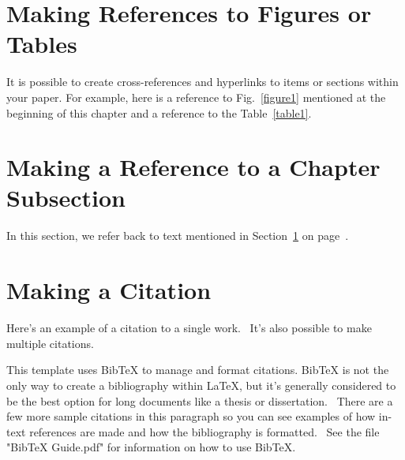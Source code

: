 
\section{Making References to Figures or Tables}
\label{makereference1.1}

It is possible to create cross-references and hyperlinks to items or
sections within your paper.  For example, here is a reference to
Fig.~\ref{figure1} mentioned at the beginning of this chapter and a
reference to the Table~\ref{table1}.

\section{Making a Reference to a Chapter Subsection}
\label{makereference1.2}

In this section, we refer back to text mentioned in
Section~\ref{makereference1.1} on page~\pageref{makereference1.1}.

\section{Making a Citation}
\label{makereference1.3}

Here's an example of a citation to a single
work.~\citep{CT:Weiner:1999} It's also possible to make multiple
citations.~\citep{CT:Phillips:1985, ARP:Loy:1974}

This template uses BibTeX to manage and format citations.  BibTeX is
not the only way to create a bibliography within LaTeX, but it's
generally considered to be the best option for long documents like a
thesis or dissertation.~\citep{CT:Gould:1988}  There are a few more
sample citations in this paragraph so you can see examples of how
in-text references are made and how the bibliography is
formatted.~\citep{ARP:Melinger:1991} See the file "BibTeX Guide.pdf"
for information on how to use BibTeX.
